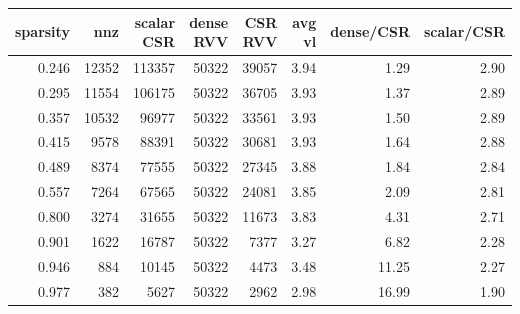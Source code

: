 \begin{tabular}{rrrrrrrr}
\toprule
sparsity & nnz & scalar CSR & dense RVV & CSR RVV & avg vl & dense/CSR & scalar/CSR \\
\midrule
0.246 & 12352 & 113357 & 50322 & 39057 & 3.94 & 1.29 & 2.90 \\
0.295 & 11554 & 106175 & 50322 & 36705 & 3.93 & 1.37 & 2.89 \\
0.357 & 10532 & 96977 & 50322 & 33561 & 3.93 & 1.50 & 2.89 \\
0.415 & 9578 & 88391 & 50322 & 30681 & 3.93 & 1.64 & 2.88 \\
0.489 & 8374 & 77555 & 50322 & 27345 & 3.88 & 1.84 & 2.84 \\
0.557 & 7264 & 67565 & 50322 & 24081 & 3.85 & 2.09 & 2.81 \\
0.800 & 3274 & 31655 & 50322 & 11673 & 3.83 & 4.31 & 2.71 \\
0.901 & 1622 & 16787 & 50322 & 7377 & 3.27 & 6.82 & 2.28 \\
0.946 & 884 & 10145 & 50322 & 4473 & 3.48 & 11.25 & 2.27 \\
0.977 & 382 & 5627 & 50322 & 2962 & 2.98 & 16.99 & 1.90 \\
\bottomrule
\end{tabular}

